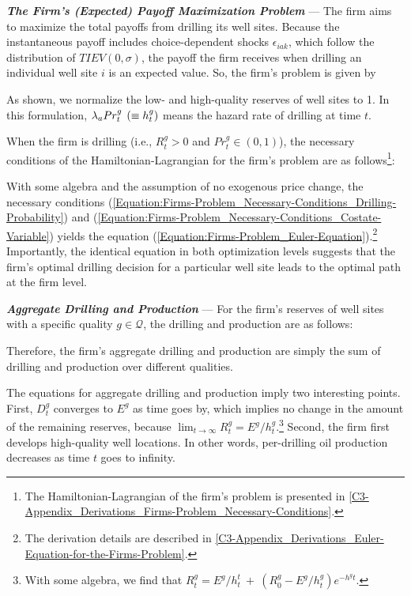 \textit{\textbf{The Firm's (Expected) Payoff Maximization Problem}} ---
The firm aims to maximize the total payoffs from drilling its well sites. Because the instantaneous payoff includes choice-dependent shocks $\epsilon_{iak}$, which follow the distribution of $TIEV(0, \sigma)$, the payoff the firm receives when drilling an individual well site $i$ is an expected value. So, the firm's problem is given by

As shown, we normalize the low- and high-quality reserves of well sites to 1. In this formulation, $\lambda_{a} Pr_{t}^{g} \hspace{0.15cm} (\equiv h_{t}^{g})$ means the hazard rate of drilling at time $t$. 

When the firm is drilling (i.e., $R_{t}^{g} > 0$ and $Pr_{t}^{g} \in (0, 1)$), the necessary conditions of the Hamiltonian-Lagrangian for the firm's problem are as follows\footnote{The Hamiltonian-Lagrangian of the firm's problem is presented in \ref{C3-Appendix_Derivations_Firms-Problem_Necessary-Conditions}.}:

With some algebra and the assumption of no exogenous price change, the necessary conditions (\ref{Equation:Firms-Problem_Necessary-Conditions_Drilling-Probability}) and (\ref{Equation:Firms-Problem_Necessary-Conditions_Costate-Variable}) yields the equation (\ref{Equation:Firms-Problem_Euler-Equation}).\footnote{The derivation details are described in \ref{C3-Appendix_Derivations_Euler-Equation-for-the-Firms-Problem}.}  Importantly, the identical equation in both optimization levels suggests that the firm's optimal drilling decision for a particular well site leads to the optimal path at the firm level. 


\par
\vspace{0.3cm}
\noindent
\textit{\textbf{Aggregate Drilling and Production}} ---
For the firm's reserves of well sites with a specific quality $g \in \mathcal{Q}$, the drilling and production are as follows:

Therefore, the firm's aggregate drilling and production are simply the sum of drilling and production over different qualities. 

The equations for aggregate drilling and production imply two interesting points. First, $D_{t}^{g}$ converges to $E^{g}$ as time goes by, which implies no change in the amount of the remaining reserves, because $\lim_{t \to \infty} R_{t}^{g} = E^{g} / h_{t}^{g}$.\footnote{With some algebra, we find that $R_{t}^{g} = E^{g}/h_{t}^{t} \ + \ (R_{0}^{g} - E^{g}/h_{t}^{g}) e^{-h^{g} t}$.} Second, the firm first develops high-quality well locations. In other words, per-drilling oil production decreases as time $t$ goes to infinity. 
